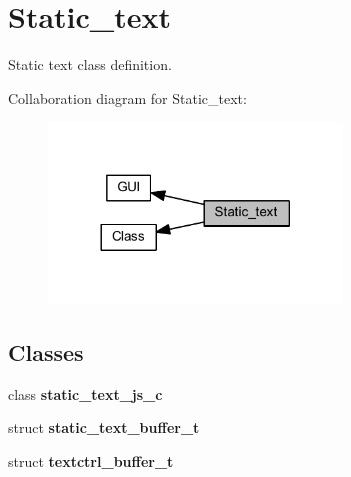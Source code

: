 \section{Static\+\_\+text}
\label{group___static__text}


Static text class definition.  


Collaboration diagram for Static\+\_\+text\+:
\nopagebreak
\begin{figure}[H]
\begin{center}
\leavevmode
\includegraphics[width=221pt]{group___static__text}
\end{center}
\end{figure}
\subsection*{Classes}
\begin{DoxyCompactItemize}
\item 
class \textbf{ static\+\_\+text\+\_\+js\+\_\+c}
\item 
struct \textbf{ static\+\_\+text\+\_\+buffer\+\_\+t}
\item 
struct \textbf{ textctrl\+\_\+buffer\+\_\+t}
\end{DoxyCompactItemize}
